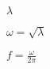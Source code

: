 \documentclass{article}
\begin{document}
$ \lambda$
\pagebreak

$ \omega = \sqrt{\lambda}$
\pagebreak

$ f = \frac{\omega}{2\pi}$
\pagebreak
\end{document}
